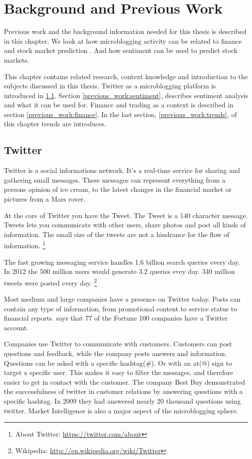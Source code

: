 \chapter{Background and Previous Work}\label{previous_work}
Previous work and the background information needed for this
thesis is described in this chapter. We look at how microblogging activity
can be related to finance and stock market prediction \cite{bollen2011}. And how
sentiment can be used to predict stock markets.

This chapter contains related research, context knowledge and introduction to
the subjects discussed in this thesis. Twitter as a microblogging platform is
introduced in \ref{previous_work:twitter}. Section
\ref{previous_work:sentiment}, describes sentiment analysis and what it can be used for.
Finance and trading as a context is described in section
\ref{previous_work:finance}. In the last section, \ref{previous_work:trends}, of
this chapter trends are introduces. 

\section{Twitter}\label{previous_work:twitter}
Twitter is a social informations network. 
It's a real-time service for sharing and gathering small messages. These
messages can represent everything from a persons opinion of ice cream, to the
latest changes in the financial market or pictures from a Mars rover. 

At the core of Twitter you have the Tweet. The Tweet is a 140 character
message. 
Tweets lets you communicate with other users, share photos and post all kinds of
information. The small size of the tweets are not a hindrance for the flow of
information. 
\footnote{About Twitter: \url{https://twitter.com/about}}

The fast growing messaging service handles 1.6 billion search queries every day.
In 2012 the 500 million users would generate 3.2 queries evey day. 340 million tweets were posted every day. 
\footnote{Wikipedia: \url{http://en.wikipedia.org/wiki/Twitter}} 

Most medium and large companies have a presence on Twitter today. Posts can contain
any type of information, from promotional content to service status to
financial reports. \cite[p8]{annikajubbega11:twitter_driver_stock_price} says
that 77 of the Fortune 100 companies have a Twitter account. 

Companies use Twitter to communicate with customers. Customers can post
questions and feedback, while the company posts answers and information.
Questions can be asked with a specific hashtag(\#). Or with an at(@) sign to target a
specific user. This makes it easy to filter the messages, and therefore easier
to get in contact with the customer. The company Best Buy demonstrated the successfulness of
twitter in customer relations by answering questions with a specific hashtag. In
2009 they had answered nearly 20 thousand questions using twitter.
\cite[p1]{Li2013206} Market Intelligence is also a major aspect of the
microblogging sphere.

